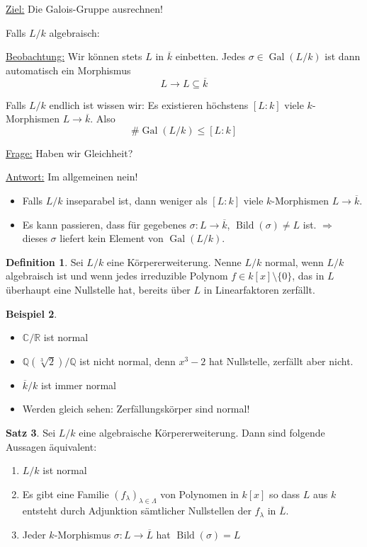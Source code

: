\documentclass[12pt,parskip=full]{scrartcl}
\newcommand{\setQ}{\mathbb{Q}}
\newcommand{\setR}{\mathbb{R}}
\newcommand{\setC}{\mathbb{C}}
\newcommand{\heading}{\underline}
\DeclareMathOperator{\Gal}{Gal}
\theoremstyle{definition}
\newtheorem{theorem}{Satz}[section]
\newtheorem{definition}[theorem]{Definition}
\newtheorem{example}[theorem]{Beispiel}
\theoremstyle{remark}
\begin{document}
	\heading{Ziel:} Die Galois-Gruppe ausrechnen!
	
	Falls $L/k$ algebraisch:
	
	\heading{Beobachtung:} Wir können stets $L$ in $\overline{k}$ einbetten. Jedes $\sigma \in \Gal(L/k)$ ist dann automatisch ein Morphismus
	\begin{equation*}
		L \to L \subseteq \overline{k}
	\end{equation*}
	
	Falls $L/k$ endlich ist wissen wir: Es existieren höchstens $[L:k]$ viele $k$-Morphismen $L \to \overline{k}$. Also
	\begin{equation*}
		\#\Gal(L/k) \leq [L:k]
	\end{equation*}
	
	\heading{Frage:} Haben wir Gleichheit?
	
	\heading{Antwort:} Im allgemeinen nein!
	\begin{itemize}
		\item Falls $L/k$ inseparabel ist, dann weniger als $[L:k]$ viele $k$-Morphismen $L \to \overline{k}$.
		\item Es kann passieren, dass für gegebenes $\sigma: L \to \overline{k}$, $\operatorname{Bild}(\sigma) \neq L$ ist. $\Rightarrow$ dieses $\sigma$ liefert kein Element von $\Gal(L/k)$.
	\end{itemize}

	\begin{definition}
		Sei $L/k$ eine Körpererweiterung. Nenne $L/k$ normal, wenn $L/k$ algebraisch ist und wenn jedes irreduzible Polynom $f \in k[x] \setminus \{ 0 \}$, das in $L$ überhaupt eine Nullstelle hat, bereits über $L$ in Linearfaktoren zerfällt.
	\end{definition}

	\begin{example}
		\begin{itemize}
			\item $\setC/\setR$ ist normal
			\item $\setQ(\sqrt[3]{2})/\setQ$ ist nicht normal, denn $x^3 - 2$ hat Nullstelle, zerfällt aber nicht.
			\item $\overline{k}/k$ ist immer normal
			\item Werden gleich sehen: Zerfällungskörper sind normal!
		\end{itemize}
	\end{example}

	\begin{theorem}
		Sei $L/k$ eine algebraische Körpererweiterung. Dann sind folgende Aussagen äquivalent:
		\begin{enumerate}
			\item $L/k$ ist normal
			\item Es gibt eine Familie $(f_\lambda)_{\lambda \in \Lambda}$ von Polynomen in $k[x]$ so dass $L$ aus $k$ entsteht durch Adjunktion sämtlicher Nullstellen der $f_\lambda$ in $\overline{L}$.
			\item Jeder $k$-Morphismus $\sigma: L \to \overline{L}$ hat $\operatorname{Bild}(\sigma) = L$
		\end{enumerate}
	\end{theorem}
\end{document}
